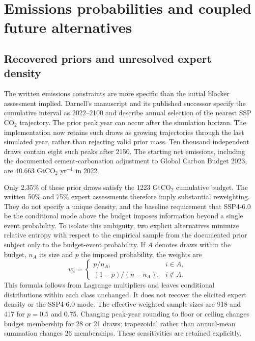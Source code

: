 \section{Emissions probabilities and coupled future alternatives}
\subsection{Recovered priors and unresolved expert density}
The written emissions constraints are more specific than the initial blocker
assessment implied. Darnell's manuscript and its published successor specify
the cumulative interval as 2022--2100 and describe annual selection of the
nearest SSP CO$_2$ trajectory\cite{darnell}. The prior peak year can occur after
the simulation horizon. The implementation now retains such draws as growing
trajectories through the last simulated year, rather than rejecting valid
prior mass. Ten thousand independent draws contain eight such peaks after 2150.
The starting net emissions, including the documented cement-carbonation
adjustment to Global Carbon Budget 2023, are 40.663 GtCO$_2$ yr$^{-1}$ in 2022.

Only 2.35\% of these prior draws satisfy the 1223 GtCO$_2$ cumulative budget.
The written 50\% and 75\% expert assessments therefore imply substantial
reweighting. They do not specify a unique density, and the baseline requirement
that SSP4-6.0 be the conditional mode above the budget imposes information beyond a single event probability.
To isolate this ambiguity, two explicit alternatives minimize relative entropy
with respect to the empirical sample from the documented prior subject only to the budget-event
probability. If $A$ denotes draws within the budget, $n_A$ its size and $p$ the
imposed probability, the weights are
\begin{equation}
 w_i=\begin{cases}p/n_A,&i\in A,\\
 (1-p)/(n-n_A),&i\notin A.\end{cases}
\end{equation}
This formula follows from Lagrange multipliers and leaves conditional
distributions within each class unchanged. It does not recover the elicited
expert density or the SSP4-6.0 mode. The effective weighted sample sizes are 918
and 417 for $p=0.5$ and 0.75. Changing peak-year rounding to floor or ceiling
changes budget membership for 28 or 21 draws; trapezoidal rather than annual-mean
summation changes 26 memberships. These sensitivities are retained explicitly.

